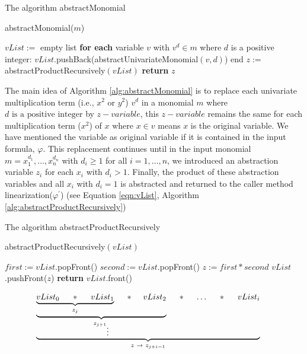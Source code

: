 \begin{algorithm}
\caption{The algorithm abstractMonomial} 
\label{alg:abstractMonomial}
abstractMonomial($m$)
\begin{algorithmic}[1]
\State $vList :=$ empty list
\State \textbf{for each} variable $v$ with $v^d \in m$ where $d$ is a positive integer:
\State \hspace{5mm} $vList$.pushBack(abstractUnivariateMonomial$(v, d)$)
\State end
\State $z :=$ abstractProductRecursively$(vList)$
\State \textbf{return} $z$
\end{algorithmic}
\end{algorithm}

\noindent The main idea of Algorithm \ref{alg:abstractMonomial} is to replace each univariate multiplication term (i.e., $x^2$ or $y^2$) $v^d$ in a monomial $m$ where $d \text{ is a positive integer}$ by $z-variable$, this $z-variable$ remains the same for each multiplication term ($x^2$) of $x$ where $x \in v$ means $x$ is the original variable.
We have mentioned the variable as original variable if it is contained in the input formula, $\varphi$.
This replacement continues until in the input monomial $m = x_{1}^{d_{1}}, \dots,x_{n}^{d_{n}}$ with $d_i \geq 1$ for all $i = 1, \dots, n$, we introduced an abstraction variable $z_i$ for each $x_i$ with $d_i > 1$.
Finally, the product of these abstraction variables and all $x_i$ with $d_i = 1$ is abstracted and returned to the caller method linearization($\varphi^\prime$) (see Equation \ref{eqn:vList}, Algorithm \ref{alg:abstractProductRecursively})\newline 

\begin{algorithm}
\caption{The algorithm abstractProductRecursively} 
\label{alg:abstractProductRecursively}
abstractProductRecursively$(vList)$
\begin{algorithmic}[1]
\State $first:= vList$.popFront() 
\State $second:= vList$.popFront()
\State $z:= first \ast second$
\State $vList$.pushFront($z$)
\EndWhile
\State \textbf{return} $vList$.front()
\end{algorithmic}
\end{algorithm}

\begin{align}
    \underbrace{ \underbrace{ \underbrace{ vList_{0} \hspace{5mm} \ast \hspace{5mm} vList_{1} }\limits_{z_{j}} \hspace{5mm} \ast \hspace{5mm} vList_{2} }\limits_{{z_{j+1}}_{\vdots}} \hspace{5mm} \ast \hspace{5mm} \dots \hspace{5mm} \ast \hspace{5mm} vList_{i}}\limits_{z \hspace{1mm} \to \hspace{1mm} z_{j+i-1}} \hspace{5mm} \label{eqn:vList}
\end{align}

